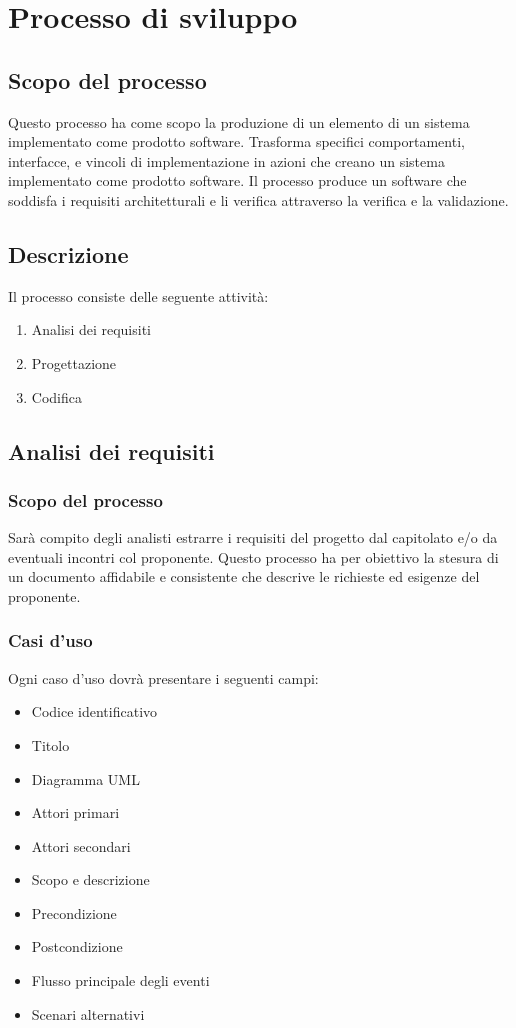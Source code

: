\documentclass[a4paper,11pt]{article}
\begin{document}
	\newpage
	\section{Processo di sviluppo}
		\subsection{Scopo del processo}
	
		Questo processo ha come scopo la produzione di un elemento di un sistema implementato come prodotto software. Trasforma specifici comportamenti, interfacce, e vincoli di implementazione in azioni che creano un sistema implementato come prodotto software. Il processo produce un software che soddisfa i requisiti architetturali e li verifica attraverso la
	verifica e la validazione.	
		\subsection{Descrizione}
		Il processo consiste delle seguente attività:
			\begin{enumerate}
				\item Analisi dei requisiti
				\item Progettazione
				\item Codifica
			\end{enumerate}
		\subsection{Analisi dei requisiti}
		
			\subsubsection{Scopo del processo}
			Sarà compito degli analisti estrarre i requisiti del progetto dal capitolato e/o da eventuali incontri col proponente. 
			Questo processo ha per obiettivo la stesura di un documento affidabile e consistente che descrive le richieste ed esigenze del proponente.

			\subsubsection{Casi d'uso}
			Ogni caso d'uso dovrà presentare i seguenti campi:
			\begin{itemize}
			\item Codice identificativo
			\item Titolo
			\item Diagramma UML\addglos
			\item Attori primari
			\item Attori secondari
			\item Scopo e descrizione
			\item Precondizione
			\item Postcondizione
			\item Flusso principale degli eventi
			\item Scenari alternativi
			\end{itemize}
							
\end{document}
